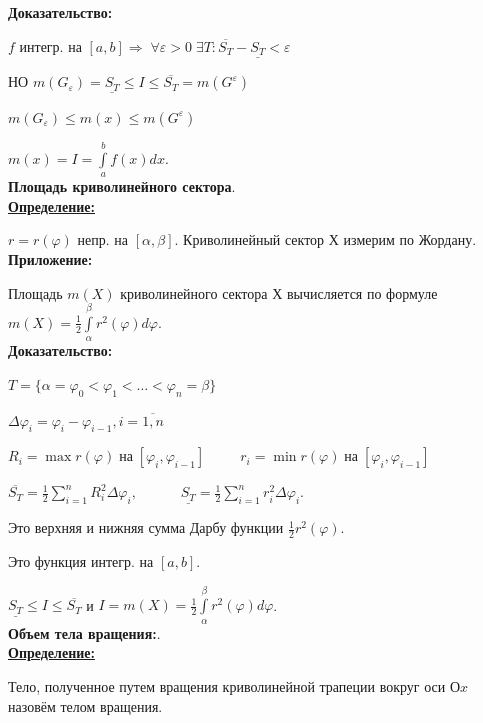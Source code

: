 \documentclass[a4paper,12pt]{article} %
\begin{document}
\textbf{Доказательство:} 

$f$ интегр. на $[a, b] \Rightarrow \; \forall \varepsilon > 0 \; \exists T: \overline{S_T} - \underline{S_T} < \varepsilon$

НО $m(G_{\varepsilon}) = \underline{S_T} \leq I \leq \overline{S_T} = m(G^{\varepsilon}) $

$m(G_{\varepsilon}) \leq m(x) \leq m(G^{\varepsilon})$

$m(x) = I = \int\limits_a^b f(x)dx$.\\

\noindent \textbf{Площадь криволинейного сектора}.\\

\underline{\textbf{Определение:}}

$r=r(\varphi)$ непр. на $[\alpha, \beta]$. Криволинейный сектор $Х$ измерим по Жордану.\\

\textbf{Приложение:}

Площадь $m(X)$ криволинейного сектора $Х$ вычисляется по формуле $m(X) =  \frac{1}{2} \int\limits_{\alpha}^{\beta} r^2(\varphi)d\varphi$.\\

\textbf{Доказательство:}

$T = \{\alpha = \varphi_0 < \varphi_1 <\dots < \varphi_n = \beta\}$

$\Delta \varphi_i = \varphi_i - \varphi_{i-1}, i = \overline{1, n}$

$R_i = \max r(\varphi)\; на\; [\varphi_i, \varphi_{i-1}]\;\;\;\;\;\;\;\;\; r_i=\min r(\varphi)\; на\; [\varphi_i, \varphi_{i-1}] $

$\overline{S_T} = \frac{1}{2}\sum\limits_{i=1}^n R_i^2 \Delta \varphi_i,\;\;\;\;\;\;\;\;\;\;\; \underline{S_T} =\frac{1}{2}\sum\limits_{i=1}^n r_i^2 \Delta \varphi_i$.

Это верхняя и нижняя сумма Дарбу функции $\frac{1}{2}r^2(\varphi)$.

Это функция интегр. на $[a, b]$.

$\underline{S_T} \leq I \leq \overline{S_T}$ и $I = m(X) = \frac{1}{2}\int\limits_{\alpha}^{\beta}r^2(\varphi)d\varphi$.\\

\noindent \textbf{Объем тела вращения:}.\\

\underline{\textbf{Определение:}}

Тело, полученное путем вращения криволинейной трапеции вокруг оси $Оx$ назовём телом вращения.\\
\end{document}
